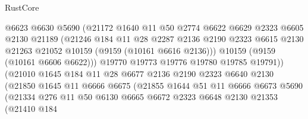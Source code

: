\begin{lexlean}{RustCore}
\begin{coremodule}
                            @6623
                            @6630
                            @5690
                            (@21172
                              @1640
                              @11
                              @50
                              @2774
                              @6622
                              @6629
                              @2323
                              @6605
                              @2130
                              @21189
                              (@21246
                                @184
                                @11
                                @28
                                @2287
                                @2136
                                @2190
                                @2323
                                @6615
                                @2130
                                @21263
                                @21052
                                @10159
                                (@9159 (@10161 @6616 @2136)))
                              @10159
                              (@9159 (@10161 @6606 @6622)))
                            @19770
                            @19773
                            @19776
                            @19780
                            @19785
                            @19791))
                        (@21010
                          @1645
                          @184
                          @11
                          @28
                          @6677
                          @2136
                          @2190
                          @2323
                          @6640
                          @2130
                          (@21850
                            @1645
                            @11
                            @6666
                            @6675
                            (@21855
                              @1644
                              @51
                              @11
                              @6666
                              @6673
                              @5690
                              (@21334
                                @276
                                @11
                                @50
                                @6130
                                @6665
                                @6672
                                @2323
                                @6648
                                @2130
                                @21353
                                (@21410
                                  @184

\end{coremodule}
\end{lexlean}
